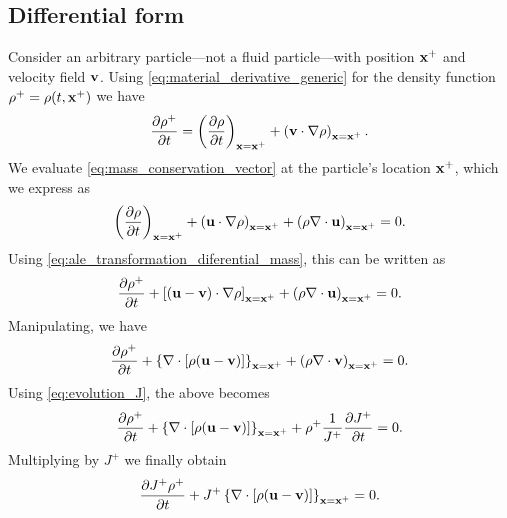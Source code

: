 \documentclass[oneside,a4paper,11pt]{report}
\begin{document}
\subsection{Differential form} 
Consider an arbitrary particle---not a fluid particle---with position $\mathbf{x}^+$ and velocity field $\mathbf{v}$. Using \cref{eq:material_derivative_generic} for the density function $\rho^+ = \rho(t,\mathbf{x}^+)$ we have
\begin{equation}
\label{eq:ale_transformation_diferential_mass}
    \frac{\partial \rho^+}{\partial t} = \left (\frac{\partial \rho}{\partial t} \right)_{\mathbf{x} = \mathbf{x}^+} + \left (\mathbf{v} \cdot \nabla \rho \right)_{\mathbf{x} = \mathbf{x}^+} .
\end{equation}
We evaluate \cref{eq:mass_conservation_vector} at the particle's location $\mathbf{x}^+$, which we express as
\begin{equation}
    \left ( \frac{\partial \rho}{\partial t} \right)_{\mathbf{x} = \mathbf{x}^+} + \left ( \mathbf{u} \cdot \nabla \rho \right)_{\mathbf{x} = \mathbf{x}^+} + \left ( \rho \nabla \cdot \mathbf{u} \right)_{\mathbf{x} = \mathbf{x}^+}= 0.
\end{equation}
Using \cref{eq:ale_transformation_diferential_mass}, this can be written as
\begin{equation}
    \frac{\partial \rho^+}{\partial t} + \left [ ( \mathbf{u} - \mathbf{v}) \cdot \nabla \rho \right]_{\mathbf{x} = \mathbf{x}^+} + \left (\rho \nabla \cdot \mathbf{u} \right)_{\mathbf{x} = \mathbf{x}^+}= 0.
\end{equation}
Manipulating, we have
\begin{equation}
    \frac{\partial \rho^+}{\partial t} + \left \{ \nabla \cdot [ \rho ( \mathbf{u} - \mathbf{v}) ] \right \}_{\mathbf{x} = \mathbf{x}^+} + \left (\rho \nabla \cdot \mathbf{v} \right)_{\mathbf{x} = \mathbf{x}^+}= 0.
\end{equation}
Using \cref{eq:evolution_J}, the above becomes
\begin{equation}
    \frac{\partial \rho^+}{\partial t} + \left \{ \nabla \cdot [ \rho ( \mathbf{u} - \mathbf{v}) ] \right \}_{\mathbf{x} = \mathbf{x}^+} + \rho^+ \frac{1}{J^+} \frac{\partial J^+}{\partial t}= 0.
\end{equation}
Multiplying by $J^+$ we finally obtain 
\begin{equation}
    \frac{\partial J^+ \rho^+}{\partial t} + J^+ \left \{ \nabla \cdot [ \rho ( \mathbf{u} - \mathbf{v}) ] \right \}_{\mathbf{x} = \mathbf{x}^+} = 0.
\end{equation}
\end{document}
